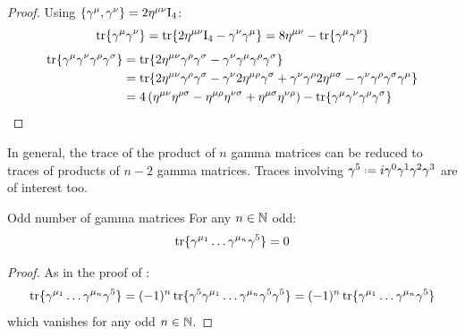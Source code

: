 \begin{proofbox}
  \begin{proof}
    Using $ \{\gamma^\mu , \gamma^\nu\} = 2 \eta^{\mu \nu} \mathrm{I}_4 $:
    \begin{equation*}
      \operatorname{tr}\{\gamma^\mu \gamma^\nu\} = \operatorname{tr}\{ 2\eta^{\mu \nu} \mathrm{I}_4 - \gamma^\nu \gamma^\mu\} = 8 \eta^{\mu \nu} - \operatorname{tr}\{\gamma^\mu \gamma^\nu\}
    \end{equation*}
    \begin{equation*}
      \begin{split}
        \operatorname{tr}\{\gamma^\mu \gamma^\nu \gamma^\rho \gamma^\sigma\}
        & = \operatorname{tr}\{2\eta^{\mu \nu} \gamma^\rho \gamma^\sigma - \gamma^\nu \gamma^\mu \gamma^\rho \gamma^\sigma\} \\
        & = \operatorname{tr}\{2\eta^{\mu \nu} \gamma^\rho \gamma^\sigma - \gamma^\nu 2 \eta^{\mu \rho} \gamma^\sigma + \gamma^\nu \gamma^\rho 2 \eta^{\mu \sigma} - \gamma^\nu \gamma^\rho \gamma^\sigma \gamma^\mu\} \\
        & = 4 \left( \eta^{\mu \nu} \eta^{\rho \sigma} - \eta^{\mu \rho} \eta^{\nu \sigma} + \eta^{\mu \sigma} \eta^{\nu \rho} \right) - \operatorname{tr}\{\gamma^\mu \gamma^\nu \gamma^\rho \gamma^\sigma\}
      \end{split}
    \end{equation*}
  \end{proof}
\end{proofbox}

In general, the trace of the product of $ n $ gamma matrices can be reduced to traces of products of $ n-2 $ gamma matrices. Traces involving $ \gamma^5 \defeq i \gamma^0 \gamma^1 \gamma^2 \gamma^3 $ are of interest too.

\begin{proposition}{Odd number of gamma matrices}{}
  For any $ n \in \mathbb{N} $ odd:
  \begin{equation}
    \operatorname{tr}\{\gamma^{\mu_1} \dots \gamma^{\mu_n} \gamma^5\} = 0
  \end{equation}
\end{proposition}

\begin{proofbox}
  \begin{proof}
    As in the proof of :
    \begin{equation*}
      \operatorname{tr}\{\gamma^{\mu_1} \dots \gamma^{\mu_n} \gamma^5\} = (-1)^n \operatorname{tr}\{\gamma^5 \gamma^{\mu_1} \dots \gamma^{\mu_n} \gamma^5 \gamma^5\} = (-1)^n \operatorname{tr}\{\gamma^{\mu_1} \dots \gamma^{\mu_n} \gamma^5\}
    \end{equation*}
    which vanishes for any odd $ n \in \mathbb{N} $.
  \end{proof}
\end{proofbox}

